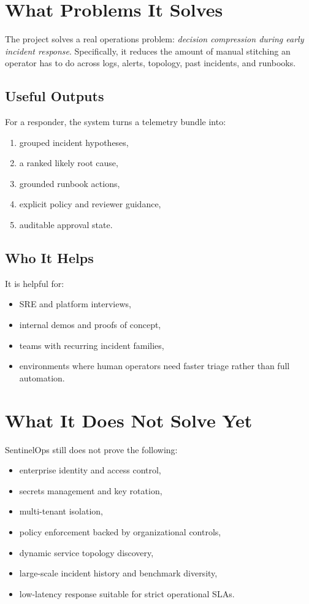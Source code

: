 \documentclass[11pt]{article}
\begin{document}
\section{What Problems It Solves}
The project solves a real operations problem: \emph{decision compression during early incident response}. Specifically, it reduces the amount of manual stitching an operator has to do across logs, alerts, topology, past incidents, and runbooks.

\subsection{Useful Outputs}
For a responder, the system turns a telemetry bundle into:
\begin{enumerate}[leftmargin=*]
\item grouped incident hypotheses,
\item a ranked likely root cause,
\item grounded runbook actions,
\item explicit policy and reviewer guidance,
\item auditable approval state.
\end{enumerate}

\subsection{Who It Helps}
It is helpful for:
\begin{itemize}[leftmargin=*]
\item SRE and platform interviews,
\item internal demos and proofs of concept,
\item teams with recurring incident families,
\item environments where human operators need faster triage rather than full automation.
\end{itemize}

\section{What It Does Not Solve Yet}
SentinelOps still does not prove the following:
\begin{itemize}[leftmargin=*]
\item enterprise identity and access control,
\item secrets management and key rotation,
\item multi-tenant isolation,
\item policy enforcement backed by organizational controls,
\item dynamic service topology discovery,
\item large-scale incident history and benchmark diversity,
\item low-latency response suitable for strict operational SLAs.
\end{itemize}
\end{document}
